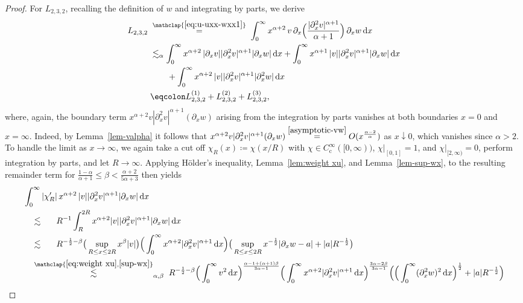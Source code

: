 \documentclass[reqno,12pt]{amsart}
\renewcommand{\d}{\ensuremath{\mathrm{d}}}
\renewcommand{\d}{\ensuremath{{\rm d}}}
\numberwithin{equation}{section}
\begin{document}
\begin{proof}
For $L_{2,3,2}$, recalling the definition of $w$ and integrating by parts, we derive 
%
\begin{align}\label{eq:u-uxxx-w-wx1}
    L_{2,3,2}
    \; &\stackrel{\mathclap{\eqref{eq:u-uxx-wxx1}}}{=} \; \int_0^\infty x^{\alpha+2} \, v\,  \partial_x\Big(\frac{|\partial_x^2 v|^{\alpha +1}}{\alpha+1}\Big) \, \partial_x w \, \d x \nonumber 
    \\
    &\lesssim_{\alpha} \int_0^\infty x^{\alpha+2}  \, |\partial_x v|  |\partial_x^2 v|^{\alpha+1}|\partial_x w| \, \d x 
    + 
    \int_0^\infty x^{\alpha+1}  \,|v|   |\partial_x^2 v|^{\alpha+1}|\partial_x w| \, \d x \nonumber \\
    & \qquad + \int_0^\infty x^{\alpha+2}  \,|v|   |\partial_x^2 v|^{\alpha+1}|\partial_x^2 w| \, \d x 
    \nonumber \\
    &\eqcolon L_{2,3,2}^{(1)} + L_{2,3,2}^{(2)}+L_{2,3,2}^{(3)}, 
\end{align}
%
where, again, the boundary term $x^{\alpha+2} v |\partial_x^2 v|^{\alpha+1} (\partial_x w)$ arising from the integration by parts vanishes at both boundaries $x=0$ and $x=\infty$. Indeed, by Lemma~\ref{lem-valpha} it follows that 
$x^{\alpha+2} v |\partial_x^2 v|^{\alpha+1} (\partial_x w) \stackrel{\eqref{asymptotic-vw}}{=} O(x^\frac{\alpha-2}{\alpha})$ as $x \downarrow 0$, which vanishes since $\alpha>2$. To handle the limit as $x \to \infty$, we again take a cut off $\chi_R(x) \coloneq \chi(x/R)$ with $\chi \in C^\infty_\mathrm{c}([0,\infty))$, $\chi|_{[0,1]} = 1$, and $\chi|_{[2,\infty)} = 0$, perform integration by parts, and let $R \to \infty$. Applying H\"older's inequality, Lemma~\ref{lem:weight xu}, and Lemma~\ref{lem-sup-wx}, to the resulting remainder term for 
$\frac{1-\alpha}{\alpha +1} \leq \beta < \frac{\alpha+2}{5\alpha +3}$ then yields
%
\begin{align*}
&\int_0^\infty |\chi_R'| \, x^{\alpha+2} \, |v| |\partial_x^2 v|^{\alpha+1}|\partial_x w| \, \d x \\
& \quad \lesssim_{\phantom{\alpha,\beta}} \; R^{-1} \int_R^{2R} x^{\alpha+2} |v| |\partial_x^2 v|^{\alpha+1}|\partial_x w|  \, \d x \\
& \quad \lesssim_{\phantom{\alpha,\beta}} \; R^{-\frac 1 2 - \beta} \big(\sup_{R \le x \le 2R} x^\beta |v|\big) \Big(\int_0^\infty x^{\alpha+2} |\partial_x^2 v|^{\alpha+1} \, \d x\Big) \big(\sup_{R \le x \le 2R} x^{-\frac 1 2} |\partial_x w -a| + |a| R^{-\frac 1 2}\big) \\
& \quad \stackrel{\mathclap{\eqref{eq:weight xu}, \eqref{sup-wx}}}{\lesssim}_{\alpha,\beta} \; R^{-\frac 1 2 - \beta} \Big(\int_0^\infty v^2 \, \d x\Big)^{\frac{\alpha-1+(\alpha+1)\beta}{3\alpha-1}} \Big(\int_0^\infty x^{\alpha+2} |\partial_x^2 v|^{\alpha+1} \, \d x\Big)^{\frac{3\alpha-2\beta}{3\alpha-1}} \Big(\Big(\int_0^\infty (\partial_x^2 w)^2 \, \d x\Big)^{\frac 1 2} + |a| R^{-\frac 1 2}\Big) \\

\end{align*}
\end{proof}
\end{document}
